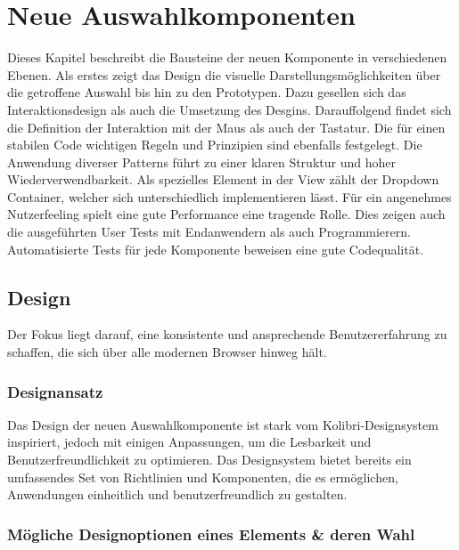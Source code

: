\chapter{Neue Auswahlkomponenten}
\label{chap:newComponent}

Dieses Kapitel beschreibt die Bausteine der neuen Komponente in verschiedenen Ebenen.
Als erstes zeigt das Design die visuelle Darstellungsmöglichkeiten über die getroffene Auswahl bis hin zu den Prototypen.
Dazu gesellen sich das Interaktionsdesign als auch die Umsetzung des Desgins. %
Darauffolgend findet sich die Definition der Interaktion mit der Maus als auch der Tastatur.
Die für einen stabilen Code wichtigen Regeln und Prinzipien sind ebenfalls festgelegt.
Die Anwendung diverser Patterns führt zu einer klaren Struktur und hoher Wiederverwendbarkeit.
Als spezielles Element in der View zählt der Dropdown Container, welcher sich unterschiedlich implementieren lässt.
Für ein angenehmes Nutzerfeeling spielt eine gute Performance eine tragende Rolle.
Dies zeigen auch die ausgeführten User Tests mit Endanwendern als auch Programmierern.
Automatisierte Tests für jede Komponente beweisen eine gute Codequalität.


\section{Design}
\label{sec:design}

Der Fokus liegt darauf, eine konsistente und ansprechende Benutzererfahrung zu schaffen, die sich über alle modernen Browser hinweg hält.


\subsection{Designansatz}
\label{sec:designIdea}

Das Design der neuen Auswahlkomponente ist stark vom Kolibri-Designsystem inspiriert, jedoch mit einigen Anpassungen, um die Lesbarkeit und Benutzerfreundlichkeit zu optimieren. 
Das Designsystem bietet bereits ein umfassendes Set von Richtlinien und Komponenten, die es ermöglichen, Anwendungen einheitlich und benutzerfreundlich zu gestalten.


\subsection{Mögliche Designoptionen eines Elements \& deren Wahl}
\label{sec:possibleDesignOptions}

